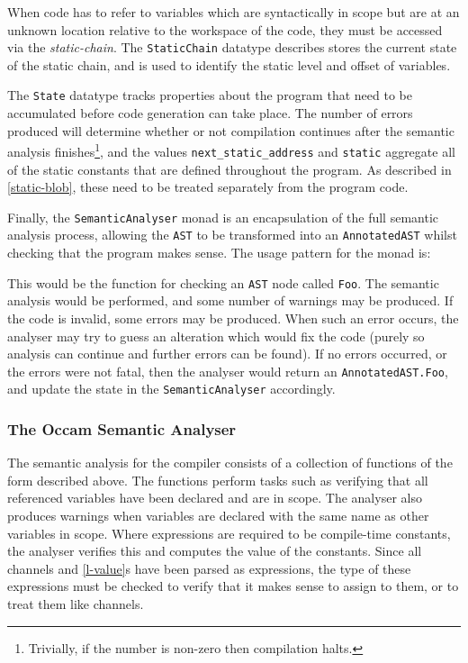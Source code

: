 When code has to refer to variables which are syntactically in scope but are at
an unknown location relative to the workspace of the code, they must be accessed
via the \textit{\gls{static-chain}}. The \texttt{StaticChain} datatype describes
stores the current state of the static chain, and is used to identify the static
level and offset of variables.

The \texttt{State} datatype tracks properties about the program that need to be
accumulated before code generation can take place. The number of errors produced
will determine whether or not compilation continues after the semantic analysis
finishes\footnote{Trivially, if the number is non-zero then compilation halts.},
and the values \texttt{next\_static\_address} and \texttt{static} aggregate all
of the static constants that are defined throughout the program.  As described
in \ref{static-blob}, these need to be treated separately from the program code.

Finally, the \texttt{SemanticAnalyser} monad is an encapsulation of the full
semantic analysis process, allowing the \texttt{AST} to be transformed into an
\texttt{AnnotatedAST} whilst checking that the program makes sense. The usage
pattern for the monad is:

This would be the function for checking an \texttt{AST} node called
\texttt{Foo}. The semantic analysis would be performed, and some number of
warnings may be produced. If the code is invalid, some errors may be produced.
When such an error occurs, the analyser may try to guess an alteration which
would fix the code (purely so analysis can continue and further errors can be
found). If no errors occurred, or the errors were not fatal, then the analyser
would return an \texttt{AnnotatedAST.Foo}, and update the state in the
\texttt{SemanticAnalyser} accordingly.

\subsubsection{The Occam Semantic Analyser}

The semantic analysis for the compiler consists of a collection of functions of
the form described above. The functions perform tasks such as verifying that all
referenced variables have been declared and are in scope. The analyser also
produces warnings when variables are declared with the same name as other
variables in scope. Where expressions are required to be compile-time constants,
the analyser verifies this and computes the value of the constants. Since all
channels and \ref{l-value}s have been parsed as expressions, the type of these
expressions must be checked to verify that it makes sense to assign to them, or
to treat them like channels.

